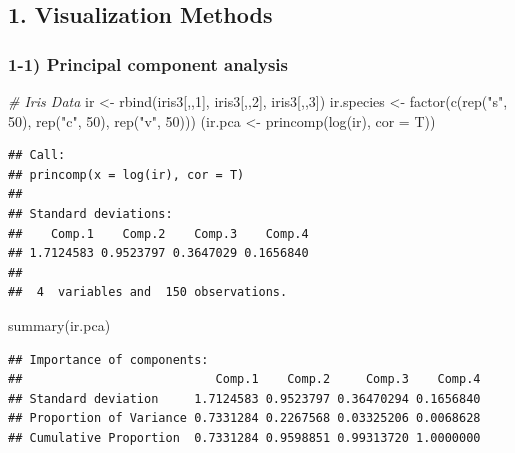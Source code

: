 \documentclass[
]{article}
\newenvironment{Shaded}{\begin{snugshade}}{\end{snugshade}}
\newcommand{\AttributeTok}[1]{\textcolor[rgb]{0.77,0.63,0.00}{#1}}
\newcommand{\CommentTok}[1]{\textcolor[rgb]{0.56,0.35,0.01}{\textit{#1}}}
\newcommand{\DecValTok}[1]{\textcolor[rgb]{0.00,0.00,0.81}{#1}}
\newcommand{\FunctionTok}[1]{\textcolor[rgb]{0.00,0.00,0.00}{#1}}
\newcommand{\NormalTok}[1]{#1}
\newcommand{\OtherTok}[1]{\textcolor[rgb]{0.56,0.35,0.01}{#1}}
\newcommand{\StringTok}[1]{\textcolor[rgb]{0.31,0.60,0.02}{#1}}
\begin{document}
\newpage

\hypertarget{visualization-methods}{%
\subsection{1. Visualization Methods}\label{visualization-methods}}

\hypertarget{principal-component-analysis}{%
\subsubsection{1-1) Principal component
analysis}\label{principal-component-analysis}}

\begin{Shaded}
\begin{Highlighting}[]
\CommentTok{\# Iris Data}
\NormalTok{ir }\OtherTok{\textless{}{-}} \FunctionTok{rbind}\NormalTok{(iris3[,,}\DecValTok{1}\NormalTok{], iris3[,,}\DecValTok{2}\NormalTok{], iris3[,,}\DecValTok{3}\NormalTok{])}
\NormalTok{ir.species }\OtherTok{\textless{}{-}} \FunctionTok{factor}\NormalTok{(}\FunctionTok{c}\NormalTok{(}\FunctionTok{rep}\NormalTok{(}\StringTok{"s"}\NormalTok{, }\DecValTok{50}\NormalTok{), }\FunctionTok{rep}\NormalTok{(}\StringTok{"c"}\NormalTok{, }\DecValTok{50}\NormalTok{), }\FunctionTok{rep}\NormalTok{(}\StringTok{"v"}\NormalTok{, }\DecValTok{50}\NormalTok{)))}
\NormalTok{(ir.pca }\OtherTok{\textless{}{-}} \FunctionTok{princomp}\NormalTok{(}\FunctionTok{log}\NormalTok{(ir), }\AttributeTok{cor =}\NormalTok{ T))}
\end{Highlighting}
\end{Shaded}

\begin{verbatim}
## Call:
## princomp(x = log(ir), cor = T)
## 
## Standard deviations:
##    Comp.1    Comp.2    Comp.3    Comp.4 
## 1.7124583 0.9523797 0.3647029 0.1656840 
## 
##  4  variables and  150 observations.
\end{verbatim}

\begin{Shaded}
\begin{Highlighting}[]
\FunctionTok{summary}\NormalTok{(ir.pca)}
\end{Highlighting}
\end{Shaded}

\begin{verbatim}
## Importance of components:
##                           Comp.1    Comp.2     Comp.3    Comp.4
## Standard deviation     1.7124583 0.9523797 0.36470294 0.1656840
## Proportion of Variance 0.7331284 0.2267568 0.03325206 0.0068628
## Cumulative Proportion  0.7331284 0.9598851 0.99313720 1.0000000
\end{verbatim}
\end{document}
